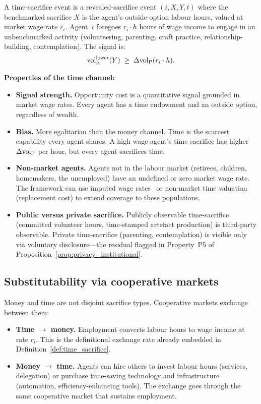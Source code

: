 \begin{definition}
\label{def:time_sacrifice}
A time-sacrifice event is a revealed-sacrifice event
$(i, X, Y, t)$ where the benchmarked sacrifice $X$ is the agent's
outside-option labour hours, valued at market wage rate $r_i$.
Agent~$i$ foregoes $r_i \cdot h$ hours of wage income to engage in
an unbenchmarked activity (volunteering, parenting, craft practice,
relationship-building, contemplation).  The signal is:
\[
  {\operatorname{vol}_{\mathrm{R}}^{\mathrm{lower}}}(Y) \;\geq\; \Delta{\operatorname{vol}_{\mathrm{P}}}(r_i \cdot h).
\]
\end{definition}

\noindent\textbf{Properties of the time channel:}
\begin{itemize}
\item \textbf{Signal strength.}  Opportunity cost is a
  quantitative signal grounded in market wage rates.  Every agent
  has a time endowment and an outside option, regardless of
  wealth.
\item \textbf{Bias.}  More egalitarian than the money channel.
  Time is the scarcest capability every agent shares.  A
  high-wage agent's time sacrifice has higher $\Delta{\operatorname{vol}_{\mathrm{P}}}$ per
  hour, but every agent sacrifices time.
\item \textbf{Non-market agents.}  Agents not in the labour
  market (retirees, children, homemakers, the unemployed) have
  an undefined or zero market wage rate.  The framework can use
  imputed wage rates~\citep{aguiar2007measuring} or non-market
  time valuation (replacement cost) to extend coverage to these
  populations.
\item \textbf{Public versus private sacrifice.}  Publicly
  observable time-sacrifice (committed volunteer hours,
  time-stamped artefact production) is third-party observable.
  Private time-sacrifice (parenting, contemplation) is visible
  only via voluntary disclosure---the residual flagged in
  Property~P5 of Proposition~\ref{prop:privacy_institutional}.
\end{itemize}

\subsection{Substitutability via cooperative markets}
\label{sec:channel_substitutability}

Money and time are not disjoint sacrifice types.  Cooperative
markets exchange between them:
\begin{itemize}
\item \textbf{Time $\to$ money.}  Employment converts labour hours
  to wage income at rate $r_i$.  This is the definitional
  exchange rate already embedded in
  Definition~\ref{def:time_sacrifice}.
\item \textbf{Money $\to$ time.}  Agents can hire others to
  invest labour hours (services, delegation) or purchase
  time-saving technology and infrastructure (automation,
  efficiency-enhancing tools).  The exchange goes through the
  same cooperative market that sustains employment.
\end{itemize}

